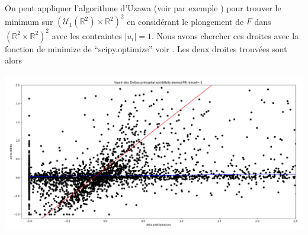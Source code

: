 \documentclass[a4paper,11pt]{article}
\begin{document}
On peut appliquer l'algorithme d'Uzawa (voir par exemple \cite{boyd2004convex}) pour trouver le minimum sur  $(\mathcal{U}_1(\mathbb{R}^2)\times\mathbb{R}^2)^2$ en considérant le plongement de $F$ dans  $(\mathbb{R}^2\times\mathbb{R}^2)^2$ avec les contraintes $|u_i|=1$. Nous avons chercher ces droites avec la fonction de minimize de ``scipy.optimize'' voir \cite{scipy}. Les deux droites trouvées sont alors 

\begin{center}
	\captionsetup{type=figure}
	\includegraphics[scale=0.28]{images/deb_prec_dec1_droites.png}
\end{center}


\newpage


\end{document}
